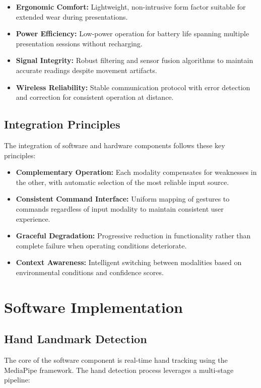 \documentclass[arxiv,usenatbib]{iupartex}
\begin{document}
\begin{itemize}
  \item \textbf{Ergonomic Comfort:} Lightweight, non-intrusive form factor suitable for extended wear during presentations.
  
  \item \textbf{Power Efficiency:} Low-power operation for battery life spanning multiple presentation sessions without recharging.
  
  \item \textbf{Signal Integrity:} Robust filtering and sensor fusion algorithms to maintain accurate readings despite movement artifacts.
  
  \item \textbf{Wireless Reliability:} Stable communication protocol with error detection and correction for consistent operation at distance.
\end{itemize}

\subsection{Integration Principles}
The integration of software and hardware components follows these key principles:

\begin{itemize}
  \item \textbf{Complementary Operation:} Each modality compensates for weaknesses in the other, with automatic selection of the most reliable input source.
  
  \item \textbf{Consistent Command Interface:} Uniform mapping of gestures to commands regardless of input modality to maintain consistent user experience.
  
  \item \textbf{Graceful Degradation:} Progressive reduction in functionality rather than complete failure when operating conditions deteriorate.
  
  \item \textbf{Context Awareness:} Intelligent switching between modalities based on environmental conditions and confidence scores.
\end{itemize}

\section{Software Implementation}
\subsection{Hand Landmark Detection}
The core of the software component is real-time hand tracking using the MediaPipe framework. The hand detection process leverages a multi-stage pipeline:
\end{document}

